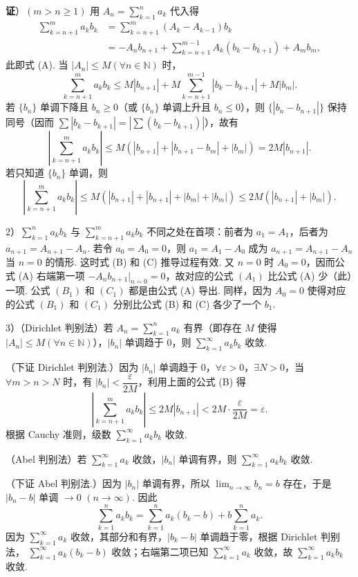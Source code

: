 \documentclass[UTF8,12pt,a4paper,fontset=fandol]{ctexart}
\begin{document}
\noindent\textbf{证}）$(m>n\ge1)$ 用
$A_n=\displaystyle\sum_{k=1}^n a_k$ 代入得
\[
\begin{aligned}
  \sum_{k=n+1}^m a_kb_k
  &=\sum_{k=n+1}^m(A_k-A_{k-1})b_k\\
  &=-A_nb_{n+1}+\sum_{k=n+1}^{m-1}A_k(b_k-b_{k+1})+A_mb_m,
\end{aligned}
\]
此即式 (A). 当 $|A_n|\le M(\forall n\in\mathbb N)$ 时，
\[
  \sum_{k=n+1}^m a_kb_k
  \le M|b_{n+1}|+M\sum_{k=n+1}^{m-1}|b_k-b_{k+1}|+M|b_m|.
\]
若 $\{b_n\}$ 单调下降且 $b_n\ge0$（或 $\{b_n\}$ 单调上升且 $b_n\le0$），则 $\{|b_n-b_{n+1}|\}$ 保持同号（因而 $\sum|b_k-b_{k+1}|=\left|\sum(b_k-b_{k+1})\right|$），故有
\[
  \left|\sum_{k=n+1}^m a_kb_k\right|
  \le M(|b_{n+1}|+|b_{n+1}-b_m|+|b_m|)
  =2M|b_{n+1}|.
\tag{B}
\]
若只知道 $\{b_n\}$ 单调，则
\[
  \left|\sum_{k=n+1}^m a_kb_k\right|
  \le M(|b_{n+1}|+|b_{n+1}|+|b_m|+|b_m|)
  \le2M(|b_{n+1}|+|b_m|).
\tag{C}
\]

2）$\displaystyle\sum_{k=1}^n a_kb_k$ 与
$\displaystyle\sum_{k=n+1}^m a_kb_k$ 不同之处在首项：前者为
$a_1=A_1$，后者为 $a_{n+1}=A_{n+1}-A_n$. 若令
$a_0=A_0=0$，则 $a_1=A_1-A_0$ 成为 $a_{n+1}=A_{n+1}-A_n$ 当 $n=0$ 的情形. 这时式 (B) 和 (C) 推导过程有效. 又 $n=0$ 时 $A_0=0$，因而公式 (A) 右端第一项 $-A_nb_{n+1}|_{n=0}=0$，故对应的公式 $(A_1)$ 比公式 (A) 少（此）一项. 公式 $(B_1)$ 和 $(C_1)$ 都是由公式 (A) 导出. 同样，因为 $A_0=0$ 使得对应的公式 $(B_1)$ 和 $(C_1)$ 分别比公式 (B) 和 (C) 各少了一个 $b_1$.

3）（Dirichlet 判别法）若 $A_n=\displaystyle\sum_{k=1}^n a_k$ 有界（即存在 $M$ 使得 $|A_n|\le M(\forall n\in\mathbb N)$），$|b_n|$ 单调趋于 $0$，则
$\displaystyle\sum_{k=1}^{\infty}a_kb_k$ 收敛.

（下证 Dirichlet 判别法.）因为 $|b_n|$ 单调趋于 $0$，$\forall\varepsilon>0$，$\exists N>0$，当 $\forall m>n>N$ 时，有 $|b_n|<\dfrac{\varepsilon}{2M}$，利用上面的公式 (B) 得
\[
  \left|\sum_{k=n+1}^m a_kb_k\right|
  \le2M|b_{n+1}|<2M\cdot\frac{\varepsilon}{2M}=\varepsilon.
\]
根据 Cauchy 准则，级数 $\displaystyle\sum_{k=1}^{\infty}a_kb_k$ 收敛.

（Abel 判别法）若 $\displaystyle\sum_{k=1}^{\infty}a_k$ 收敛，$|b_n|$ 单调有界，则
$\displaystyle\sum_{k=1}^{\infty}a_kb_k$ 收敛.

（下证 Abel 判别法.）因为 $|b_n|$ 单调有界，所以
$\displaystyle\lim_{n\to\infty}b_n=b$ 存在，于是 $|b_n-b|$ 单调 $\to0$ $(n\to\infty)$. 因此
\[
  \sum_{k=1}^n a_kb_k
  =\sum_{k=1}^n a_k(b_k-b)+b\sum_{k=1}^n a_k.
\]
因为 $\displaystyle\sum_{k=1}^{\infty}a_k$ 收敛，其部分和有界，$|b_k-b|$ 单调趋于零，根据 Dirichlet 判别法，
$\displaystyle\sum_{k=1}^{\infty}a_k(b_k-b)$ 收敛；右端第二项已知
$\displaystyle\sum_{k=1}^{\infty}a_k$ 收敛，故
$\displaystyle\sum_{k=1}^{\infty}a_kb_k$ 收敛.
\end{document}
